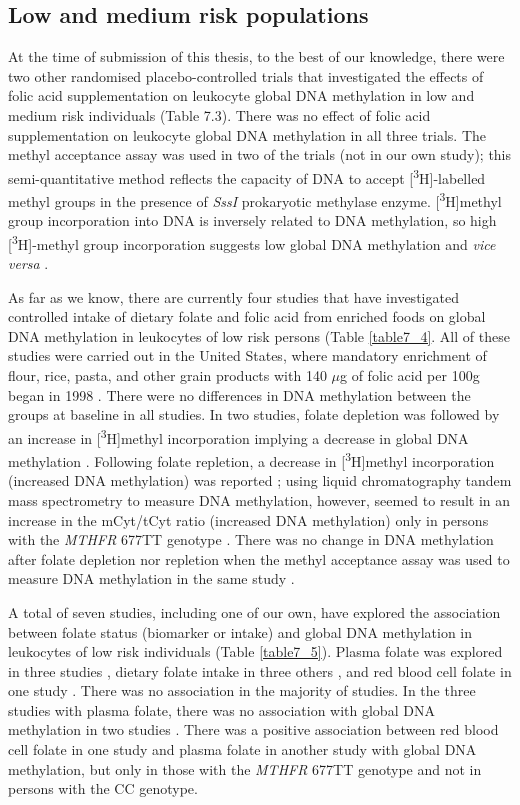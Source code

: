 \subsection{Low and medium risk populations} %
\noindent At the time of submission of this thesis, to the best of our knowledge, there were two other randomised placebo-controlled trials that investigated the effects of folic acid supplementation on leukocyte global DNA methylation in low and medium risk individuals (Table 7.3). There was no effect of folic acid supplementation on leukocyte global DNA methylation in all three trials. The methyl acceptance assay was used in two of the trials (not in our own study); this semi-quantitative method reflects the capacity of DNA to accept [\textsuperscript{3}H]-labelled methyl groups in the presence of \emph{SssI} prokaryotic methylase enzyme. [\textsuperscript{3}H]methyl group incorporation into DNA is inversely related to DNA methylation, so high [\textsuperscript{3}H]-methyl group incorporation suggests low global DNA methylation and \emph{vice versa} \cite{c71}.

\noindent As far as we know, there are currently four studies that have investigated controlled intake of dietary folate and folic acid from enriched foods on global DNA methylation in leukocytes of low risk persons (Table \ref{table7_4}. All of these studies were carried out in the United States, where mandatory enrichment of flour, rice, pasta, and other grain products with 140 $\mu$g of folic acid per 100g began in 1998 \cite{c72}. There were no differences in DNA methylation between the groups at baseline in all studies. In two studies, folate depletion was followed by an increase in [\textsuperscript{3}H]methyl incorporation implying a decrease in global DNA methylation \cite{c73,c74}. Following folate repletion, a decrease in [\textsuperscript{3}H]methyl incorporation (increased DNA methylation) was reported \cite{c73}; using liquid chromatography tandem mass spectrometry to measure DNA methylation, however, seemed to result in an increase in the mCyt/tCyt ratio (increased DNA methylation) only in 
persons with the \emph{MTHFR} 677TT genotype \cite{c75}. There was no change in DNA methylation after folate depletion nor repletion when the methyl acceptance assay was used to measure DNA methylation in the same study \cite{c75}. 
 
\noindent A total of seven studies, including one of our own, have explored the association between folate status (biomarker or intake) and global DNA methylation in leukocytes of low risk individuals (Table \ref{table7_5}). Plasma folate was explored in three studies \cite{c76,c77,c78}, dietary folate intake in three others \cite{c79,c710,c711}, and red blood cell folate in one study \cite{c712}. There was no association in the majority of studies. In the three studies with plasma folate, there was no association with global DNA methylation in two studies \cite{c77,c78}. There was a positive association between red blood cell folate \cite{c712} in one study and plasma folate \cite{c76} in another study with global DNA methylation, but only in those with the \emph{MTHFR} 677TT genotype and not in persons with the CC genotype.

